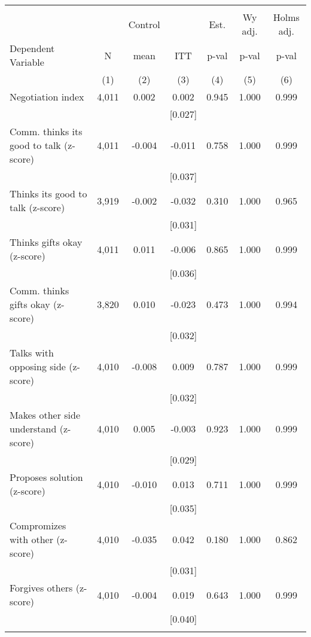\begin{tabular}{lcccccc}
\hline \noalign{\smallskip} &  &  &  &  &  & \\
 &  & Control &  & Est. & Wy adj. & Holms adj.\\
Dependent Variable & N & mean & ITT & p-val & p-val & p-val\\
 & (1) & (2) & (3) & (4) & (5) & (6)\\
\noalign{\smallskip}\hline \noalign{\smallskip}\quad Negotiation index & 4,011 & 0.002 & 0.002 & 0.945 & 1.000 & 0.999\\
 &  &  & [0.027] &  &  & \\
\quad Comm. thinks its good to talk (z-score) & 4,011 & -0.004 & -0.011 & 0.758 & 1.000 & 0.999\\
 &  &  & [0.037] &  &  & \\
\quad Thinks its good to talk (z-score) & 3,919 & -0.002 & -0.032 & 0.310 & 1.000 & 0.965\\
 &  &  & [0.031] &  &  & \\
\quad Thinks gifts okay (z-score) & 4,011 & 0.011 & -0.006 & 0.865 & 1.000 & 0.999\\
 &  &  & [0.036] &  &  & \\
\quad Comm. thinks gifts okay (z-score) & 3,820 & 0.010 & -0.023 & 0.473 & 1.000 & 0.994\\
 &  &  & [0.032] &  &  & \\
\quad Talks with opposing side (z-score) & 4,010 & -0.008 & 0.009 & 0.787 & 1.000 & 0.999\\
 &  &  & [0.032] &  &  & \\
\quad Makes other side understand (z-score) & 4,010 & 0.005 & -0.003 & 0.923 & 1.000 & 0.999\\
 &  &  & [0.029] &  &  & \\
\quad Proposes solution (z-score) & 4,010 & -0.010 & 0.013 & 0.711 & 1.000 & 0.999\\
 &  &  & [0.035] &  &  & \\
\quad Compromizes with other (z-score) & 4,010 & -0.035 & 0.042 & 0.180 & 1.000 & 0.862\\
 &  &  & [0.031] &  &  & \\
\quad Forgives others (z-score) & 4,010 & -0.004 & 0.019 & 0.643 & 1.000 & 0.999\\
 &  &  & [0.040] &  &  & \\
\noalign{\smallskip}\hline\end{tabular}
